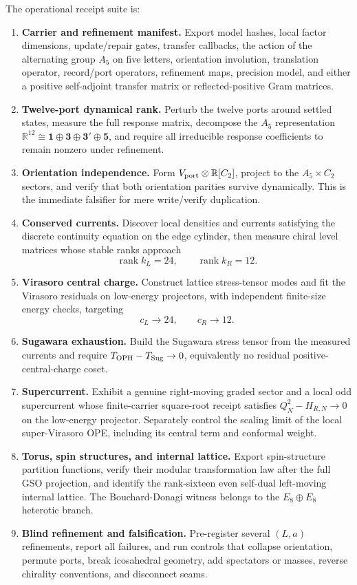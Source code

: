 \documentclass[11pt]{article}
\theoremstyle{remark}
\theoremstyle{plain}
\newcommand{\OPH}{\mathrm{OPH}}
\begin{document}
The operational receipt suite is:
\begin{enumerate}[leftmargin=2em,label=\textbf{FC-\arabic*.}]
\item \textbf{Carrier and refinement manifest.} Export model hashes, local factor dimensions,
update/repair gates, transfer callbacks, the action of the alternating group
\(A_5\) on five letters, orientation involution, translation
operator, record/port operators, refinement maps, precision model, and either a positive
self-adjoint transfer matrix or reflected-positive Gram matrices.
\item \textbf{Twelve-port dynamical rank.} Perturb the twelve ports around settled states, measure
the full response matrix, decompose the \(A_5\) representation
\(\mathbb R^{12}\cong\mathbf1\oplus\mathbf3\oplus\mathbf3'\oplus\mathbf5\), and require all
irreducible response coefficients to remain nonzero under refinement.
\item \textbf{Orientation independence.} Form
\(V_{\rm port}\otimes\mathbb R[C_2]\), project to the \(A_5\times C_2\) sectors, and verify that
both orientation parities survive dynamically. This is the immediate falsifier for mere
write/verify duplication.
\item \textbf{Conserved currents.} Discover local densities and currents satisfying the discrete
continuity equation on the edge cylinder, then measure chiral level matrices whose stable ranks
approach
\[
\operatorname{rank}k_L=24,\qquad \operatorname{rank}k_R=12.
\]
\item \textbf{Virasoro central charge.} Construct lattice stress-tensor modes and fit the
Virasoro residuals on low-energy projectors, with independent finite-size energy checks, targeting
\[
c_L\to24,\qquad c_R\to12.
\]
\item \textbf{Sugawara exhaustion.} Build the Sugawara stress tensor from the measured currents
and require \(T_{\OPH}-T_{\rm Sug}\to0\), equivalently no residual positive-central-charge coset.
\item \textbf{Supercurrent.} Exhibit a genuine right-moving graded sector and a local odd
supercurrent whose finite-carrier square-root receipt satisfies \(Q_N^2-H_{R,N}\to0\) on the
low-energy projector. Separately control the scaling limit of the local
super-Virasoro OPE, including its central term and conformal weight.
\item \textbf{Torus, spin structures, and internal lattice.} Export spin-structure partition
functions, verify their modular transformation law after the full GSO projection, and identify the
rank-sixteen even self-dual left-moving internal lattice. The Bouchard-Donagi witness belongs to
the \(E_8\oplus E_8\) heterotic branch.
\item \textbf{Blind refinement and falsification.} Pre-register several \((L,a)\) refinements,
report all failures, and run controls that collapse orientation, permute ports, break icosahedral
geometry, add spectators or masses, reverse chirality conventions, and disconnect seams.
\end{enumerate}
\end{document}
